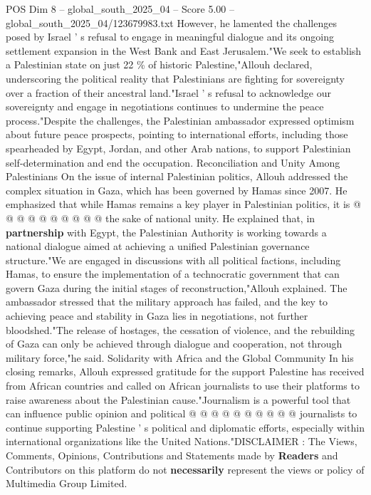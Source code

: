 \begin{textsample}{POS Dim 8 – global\_south\_2025\_04 – Score 5.00 – global\_south\_2025\_04/123679983.txt}
However, he lamented the challenges posed by Israel ' s refusal to engage in meaningful dialogue and its ongoing settlement expansion in the West Bank and East Jerusalem."We seek to establish a Palestinian state on just 22 \% of historic Palestine,"Allouh declared, underscoring the political reality that Palestinians are fighting for sovereignty over a fraction of their ancestral land."Israel ' s refusal to acknowledge our sovereignty and engage in negotiations continues to undermine the peace process."Despite the challenges, the Palestinian ambassador expressed optimism about future peace prospects, pointing to international efforts, including those spearheaded by Egypt, Jordan, and other Arab nations, to support Palestinian self-determination and end the occupation.
Reconciliation and Unity Among Palestinians On the issue of internal Palestinian politics, Allouh addressed the complex situation in Gaza, which has been governed by Hamas since 2007.
He emphasized that while Hamas remains a key player in Palestinian politics, it is @ @ @ @ @ @ @ @ @ @ the sake of national unity.
He explained that, in \textbf{partnership} with Egypt, the Palestinian Authority is working towards a national dialogue aimed at achieving a unified Palestinian governance structure."We are engaged in discussions with all political factions, including Hamas, to ensure the implementation of a technocratic government that can govern Gaza during the initial stages of reconstruction,"Allouh explained.
The ambassador stressed that the military approach has failed, and the key to achieving peace and stability in Gaza lies in negotiations, not further bloodshed."The release of hostages, the cessation of violence, and the rebuilding of Gaza can only be achieved through dialogue and cooperation, not through military force,"he said.
Solidarity with Africa and the Global Community In his closing remarks, Allouh expressed gratitude for the support Palestine has received from African countries and called on African journalists to use their platforms to raise awareness about the Palestinian cause."Journalism is a powerful tool that can influence public opinion and political @ @ @ @ @ @ @ @ @ @ journalists to continue supporting Palestine ' s political and diplomatic efforts, especially within international organizations like the United Nations."DISCLAIMER : The Views, Comments, Opinions, Contributions and Statements made by \textbf{Readers} and Contributors on this platform do not \textbf{necessarily} represent the views or policy of Multimedia Group Limited.

\end{textsample}
